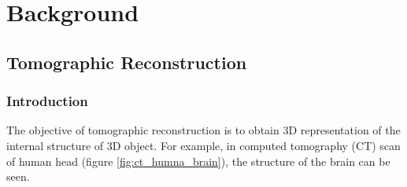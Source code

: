 \documentclass[twoside]{iitbreport}
\begin{document}


 

                    

\makecontents %


\cleardoublepage
\setcounter{page}{1}


\chapter{Background}

\section{Tomographic Reconstruction}\label{sec:tomo_recons}
\subsection{Introduction}
The objective of tomographic reconstruction is to obtain 3D representation of the internal structure of 3D object. For example, in computed tomography (CT) scan of human head (figure \ref{fig:ct_humna_brain}), the structure of the brain can be seen.
\end{document}
